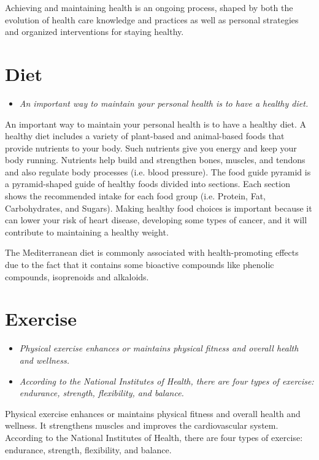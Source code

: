 Achieving and maintaining health is an ongoing process, shaped by both
the evolution of health care knowledge and practices as well as personal
strategies and organized interventions for staying healthy.

\section{Diet}\label{diet}

\begin{itemize}
\item
  \emph{An important way to maintain your personal health is to have a
  healthy diet.}
\end{itemize}

An important way to maintain your personal health is to have a healthy
diet. A healthy diet includes a variety of plant-based and animal-based
foods that provide nutrients to your body. Such nutrients give you
energy and keep your body running. Nutrients help build and strengthen
bones, muscles, and tendons and also regulate body processes (i.e. blood
pressure). The food guide pyramid is a pyramid-shaped guide of healthy
foods divided into sections. Each section shows the recommended intake
for each food group (i.e. Protein, Fat, Carbohydrates, and Sugars).
Making healthy food choices is important because it can lower your risk
of heart disease, developing some types of cancer, and it will
contribute to maintaining a healthy weight.

The Mediterranean diet is commonly associated with health-promoting
effects due to the fact that it contains some bioactive compounds like
phenolic compounds, isoprenoids and alkaloids.

\section{Exercise}\label{exercise}

\begin{itemize}
\item
  \emph{Physical exercise enhances or maintains physical fitness and
  overall health and wellness.}
\item
  \emph{According to the National Institutes of Health, there are four
  types of exercise: endurance, strength, flexibility, and balance.}
\end{itemize}

Physical exercise enhances or maintains physical fitness and overall
health and wellness. It strengthens muscles and improves the
cardiovascular system. According to the National Institutes of Health,
there are four types of exercise: endurance, strength, flexibility, and
balance.

